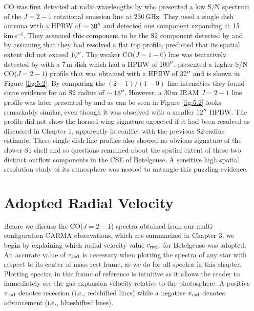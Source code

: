 CO was first detected at radio wavelengths by \cite{knapp_1980} who presented a low S/N spectrum of the $J= 2-1$ rotational emission line at 230\,GHz. They used a single dish antenna with a HPBW of $\sim 30^{\prime\prime}$ and detected one component expanding at 15\,km\,s$^{-1}$. They assumed this component to be the S2 component detected by  \cite{bernat_1979} and by assuming that they had resolved a flat top profile, predicted that its spatial extent did not exceed $10^{\prime\prime}$. The weaker CO($J=1-0$) line was tentatively detected by \cite{knapp_1985} with a 7\,m dish which had a HPBW of 100$^{\prime\prime}$. \cite{huggins_1987} presented a higher S/N CO($J=2-1$) profile that was obtained with a HPBW of 32$^{\prime\prime}$ and is shown in Figure \ref{fig:5.2}. By comparing the  $(2-1)/(1-0)$ line intensities they found some evidence for an S2 radius of $\sim 16^{\prime\prime}$. However,  a 30\,m IRAM $J= 2-1$ line profile was later presented by \cite{huggins_1994} and as can be seen in Figure \ref{fig:5.2} looks remarkably similar, even though it was observed with a smaller 12$^{\prime\prime}$ HPBW. The profile did not show the horned wing signature expected if it had been resolved as discussed in Chapter 1, apparently in conflict with the previous S2 radius estimate. These single dish line profiles also showed no obvious signature of the slower S1 shell and so questions remained about the spatial extent of these two distinct outflow components in the CSE of Betelgeuse. A sensitive high spatial resolution study of its atmosphere was needed to untangle this puzzling evidence.

\section{Adopted Radial Velocity}\label{sec:5.2}

Before we discuss the CO($J=2-1$) spectra obtained from our multi-configuration CARMA observations, which are summarized in Chapter 3, we begin by explaining which radial velocity value $v_{\rm{rad}}$, for Betelgeuse was adopted. An accurate value of $v_{\rm{rad}}$ is necessary when plotting the spectra of any star with respect to its center of mass rest frame, as we do for all spectra in this chapter. Plotting spectra in this frame of reference is intuitive as it allows the reader to immediately see the gas expansion velocity relative to the photosphere. A positive $v_{\rm{rad}}$ denotes recession (i.e., redshifted lines) while a negative $v_{\rm{rad}}$ denotes advancement (i.e., blueshifted lines).

